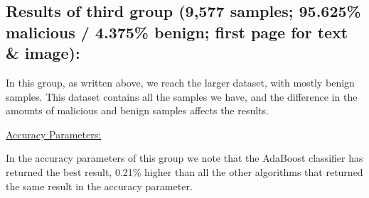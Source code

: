 \documentclass{article}
\begin{document}
\subsection{Results of third group (9,577 samples; 95.625\% malicious / 4.375\% benign; first page for text \& image):}
\indent	In this group, as written above, we reach the larger dataset, with mostly benign samples. This dataset contains all the samples we have, and the difference in the amounts of malicious and benign samples affects the results.

\noindent\underline{Accuracy Parameters:}

\indent	In the accuracy parameters of this group we note that the AdaBoost classifier has returned the best result, 0.21\% higher than all the other algorithms that returned the same result in the accuracy parameter. 
\end{document}
